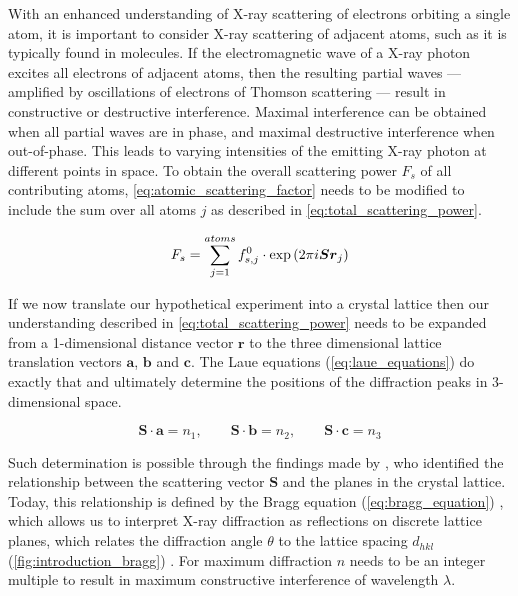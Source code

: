 With an enhanced understanding of X-ray scattering of electrons orbiting a single atom, it is important to consider X-ray scattering of adjacent atoms, such as it is typically found in molecules. If the electromagnetic wave of a X-ray photon excites all electrons of adjacent atoms, then the resulting partial waves --- amplified by oscillations of electrons of Thomson scattering --- result in constructive or destructive interference. Maximal interference can be obtained when all partial waves are in phase, and maximal destructive interference when out-of-phase. This leads to varying intensities of the emitting X-ray photon at different points in space. To obtain the overall scattering power $F_s$ of all contributing atoms, \cref{eq:atomic_scattering_factor} needs to be modified to include the sum over all atoms $j$ as described in \cref{eq:total_scattering_power}.

\begin{equation}
    F_s=\sum_{j=1}^{atoms}f_{s,j}^0 \cdot \exp\left(2\pi\\i\boldsymbol{S}\boldsymbol{r}_j\right)
    \label{eq:total_scattering_power}
\end{equation}

If we now translate our hypothetical experiment into a crystal lattice then our understanding described in \cref{eq:total_scattering_power} needs to be expanded from a 1-dimensional distance vector $\boldsymbol{r}$ to the three dimensional lattice translation vectors $\boldsymbol{a}$, $\boldsymbol{b}$ and $\boldsymbol{c}$. The Laue equations (\cref{eq:laue_equations}) do exactly that and ultimately determine the positions of the diffraction peaks in 3-dimensional space.

\begin{equation}
    \boldsymbol{S} \cdot \boldsymbol{a}=n_1, \quad \quad \boldsymbol{S} \cdot \boldsymbol{b}=n_2, \quad \quad \boldsymbol{S} \cdot \boldsymbol{c}=n_3
    \label{eq:laue_equations}
\end{equation}

Such determination is possible through the findings made by \textcite{Bragg1913-cx}, who identified the relationship between the scattering vector $\boldsymbol{S}$ and the planes in the crystal lattice. Today, this relationship is defined by the Bragg equation (\cref{eq:bragg_equation}) \cite{Bragg1913-cx}, which allows us to interpret X-ray diffraction as reflections on discrete lattice planes, which relates the diffraction angle $\theta$ to the lattice spacing $d_{hkl}$ (\cref{fig:introduction_bragg}) \cite{Rupp2010-nc}. For maximum diffraction $n$ needs to be an integer multiple to result in maximum constructive interference of wavelength $\lambda$.

